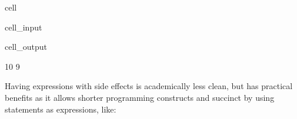 \documentclass[a4paper,10pt,english]{jupyterBook}
\begin{document}
\begin{sphinxuseclass}{cell}\begin{sphinxVerbatimInput}

\begin{sphinxuseclass}{cell_input}
\begin{sphinxVerbatim}[commandchars=\\\{\}]

\end{sphinxVerbatim}

\end{sphinxuseclass}\end{sphinxVerbatimInput}
\begin{sphinxVerbatimOutput}

\begin{sphinxuseclass}{cell_output}
\begin{sphinxVerbatim}[commandchars=\\\{\}]
10
9
\end{sphinxVerbatim}

\end{sphinxuseclass}\end{sphinxVerbatimOutput}

\end{sphinxuseclass}
\sphinxAtStartPar
Having expressions with side effects is academically less clean, but has practical benefits as it allows shorter programming constructs and succinct  by using statements as expressions, like:
\end{document}
